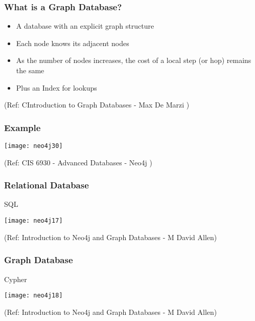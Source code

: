 \begin{frame}\frametitle{What is a Graph Database?}

\begin{itemize}
\item A database with an explicit graph structure
\item Each node knows its adjacent nodes 
\item As the number of nodes increases, the cost of a local step (or hop) remains the same
\item Plus an Index for lookups
\end{itemize}

{\tiny (Ref: CIntroduction to Graph Databases - Max De Marzi )}
\end{frame}


\begin{frame}\frametitle{Example}


\begin{center}
\texttt{[image: neo4j30]}
\end{center}	

{\tiny (Ref: CIS 6930 - Advanced Databases - Neo4j )}
\end{frame}

\begin{frame}[fragile]\frametitle{Relational Database}
SQL

\begin{center}
\texttt{[image: neo4j17]}
\end{center}	    

{\tiny (Ref: Introduction to Neo4j and Graph Databases
 - M David Allen)}

\end{frame}

\begin{frame}[fragile]\frametitle{Graph Database}
Cypher

\begin{center}
\texttt{[image: neo4j18]}
\end{center}	    

{\tiny (Ref: Introduction to Neo4j and Graph Databases
 - M David Allen)}

\end{frame}

